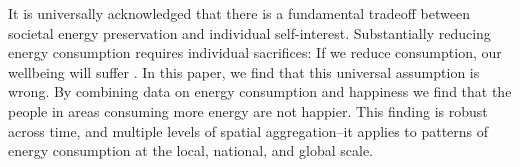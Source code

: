 \documentclass[10pt, letterpaper]{article}
\begin{document}
\begin{spacing}{1.0}
It is universally acknowledged that there is a fundamental tradeoff between
societal energy preservation and individual self-interest. Substantially reducing
energy consumption requires individual sacrifices: If we reduce consumption, our
wellbeing will 
suffer \citep{gordon_wsj_may_29_14, dietz15, jorgenson14B, carter_pbs_apr_18_77,smil05}. %
%
%
%
%
%
In this paper, we find that this universal assumption is wrong.  By combining
data on energy consumption and happiness we find that the
 people in areas consuming more energy are not happier.
This finding is robust across time, and multiple levels of spatial aggregation--it applies to patterns of energy consumption  at the local, national, and global scale.  



\end{spacing}
\end{document}
